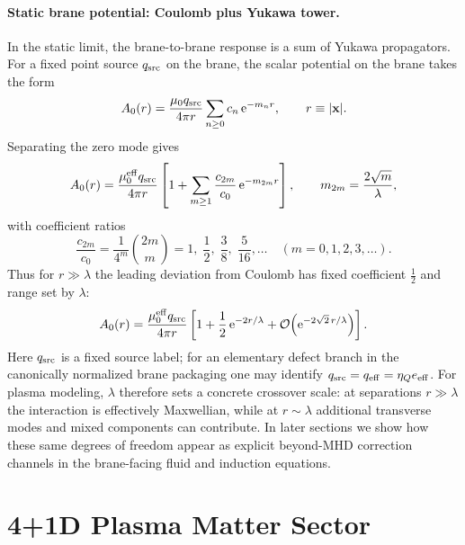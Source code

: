 \documentclass[11pt]{article}
\newcommand{\ee}{\mathrm{e}}
\newcommand{\x}{\mathbf{x}}     %
\newcommand{\muzero}{\mu_0}
\newcommand{\muzeff}{\mu_0^{\rm eff}}
\begin{document}
\paragraph{Static brane potential: Coulomb plus Yukawa tower.}
In the static limit, the brane-to-brane response is a sum of Yukawa propagators.
For a fixed point source \(q_{\rm src}\) on the brane, the scalar potential on the brane takes the
form
\begin{equation}
A_0(r)
=\frac{\muzero q_{\rm src}}{4\pi r}\sum_{n\ge 0} c_n\,\ee^{-m_n r},
\qquad r\equiv|\x|.
\label{eq:A0_KK_sum_em}
\end{equation}
Separating the zero mode gives
\begin{equation}
A_0(r)
=\frac{\muzeff q_{\rm src}}{4\pi r}
\left[1+\sum_{m\ge 1}\frac{c_{2m}}{c_0}\,\ee^{-m_{2m}r}\right],
\qquad
m_{2m}=\frac{2\sqrt{m}}{\lambda},
\label{eq:A0_mu_eff_form_em}
\end{equation}
with coefficient ratios
\begin{equation}
\frac{c_{2m}}{c_0}=\frac{1}{4^m}\binom{2m}{m}
=1,\;\frac12,\;\frac{3}{8},\;\frac{5}{16},\ldots\quad (m=0,1,2,3,\ldots).
\label{eq:ratio_cn_em}
\end{equation}
Thus for \(r\gg \lambda\) the leading deviation from Coulomb has fixed coefficient
\(\tfrac12\) and range set by \(\lambda\):
\begin{equation}
A_0(r)
=\frac{\muzeff q_{\rm src}}{4\pi r}
\left[1+\frac12\,\ee^{-2r/\lambda}
+\mathcal{O}\!\left(\ee^{-2\sqrt{2}\,r/\lambda}\right)\right].
\label{eq:leading_yukawa_em}
\end{equation}
Here \(q_{\rm src}\) is a fixed source label; for an elementary defect branch in the
canonically normalized brane packaging one may identify
\(q_{\rm src}=q_{\rm eff}=\eta_Q e_{\rm eff}\).
For plasma modeling, \(\lambda\) therefore sets a concrete crossover scale: at
separations \(r\gg\lambda\) the interaction is effectively Maxwellian, while at
\(r\sim\lambda\) additional transverse modes and mixed components can contribute.
In later sections we show how these same degrees of freedom appear as explicit
beyond-MHD correction channels in the brane-facing fluid and induction equations.

\section{4+1D Plasma Matter Sector}
\label{sec:matter_sector}
\end{document}
